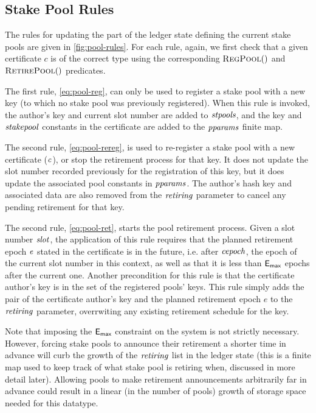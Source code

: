 \subsection{Stake Pool Rules}
\label{sec:pool-rules}


The rules for updating the part of the ledger state defining the current stake
pools are given in \cref{fig:pool-rules}.
For each rule, again, we first check that a given certificate $c$ is of
the correct type using the
corresponding $\RegPool$ and $\RetirePool$ predicates.


The first rule, \cref{eq:pool-reg}, can only be used to register a stake pool
with a new key (to which no stake pool was previously registered).
When this rule is invoked,
 the author's key and current slot number are added to $\mathit{stpools}$, and the
key and $\mathit{stakepool}$ constants in the certificate are added to the $\mathit{pparams}$
finite map.

The second rule, \cref{eq:pool-rereg}, is used to re-register a
stake pool with a new certificate ($\mathit{c}$), or stop the retirement
process for that key. It does not update the slot number recorded previously
for the registration of this key, but it does update the associated pool constants
in $\mathit{pparams}$. The author's hash key and associated data
are also removed from the $\mathit{retiring}$ parameter to cancel any pending
retirement for that key.

The second rule, \cref{eq:pool-ret}, starts the pool retirement process. Given a
slot number $\mathit{slot}$, the application of this rule requires that the
planned retirement epoch $\mathit{e}$ stated in the certificate is in the future,
i.e. after
$\mathit{cepoch}$, the epoch of the current slot number in this context, as well as
that it is
less than $\mathsf{E_{max}}$ epochs after the current one. Another precondition for this
rule is that
the certificate author's key is in the set of the registered pools' keys.
This rule simply adds the pair of the
certificate author's key and the planned retirement epoch $e$ to the $\mathit{retiring}$
parameter, overrwiting any existing retirement schedule for the key.

Note that imposing the $\mathsf{E_{max}}$ constraint on the system is not strictly necessary.
However, forcing stake pools to announce their retirement a shorter time in
advance will curb the growth of the $\mathit{retiring}$ list in the ledger state
(this is a finite map used to keep track of what stake pool is retiring when,
discussed in more detail later).
Allowing pools to make retirement announcements arbitrarily far in advance
could result in a linear (in the number of pools) growth of storage space needed
for this datatype.

